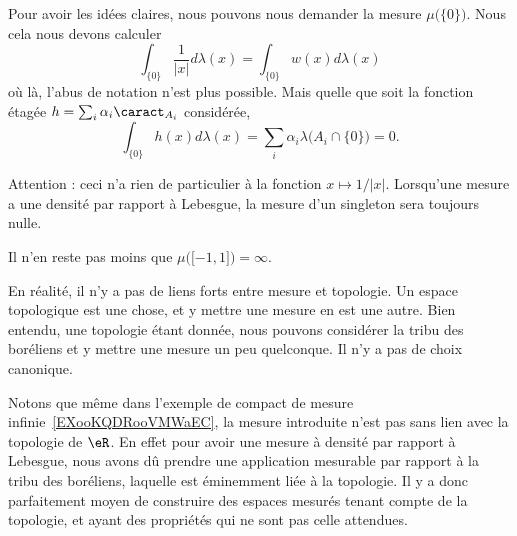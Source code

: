 \begin{example}
\begin{subproof}

		Pour avoir les idées claires, nous pouvons nous demander la mesure \( \mu\big( \{ 0 \} \big)\). Nous cela nous devons calculer
		\begin{equation}
			\int_{\{ 0 \}}\frac{1}{ | x | }d\lambda(x)=\int_{\{ 0 \}}w(x)d\lambda(x)
		\end{equation}
		où là, l'abus de notation n'est plus possible. Mais quelle que soit la fonction étagée \( h=\sum_i\alpha_i\caract_{A_i}\) considérée,
		\begin{equation}
			\int_{\{ 0 \}}h(x)d\lambda(x)=\sum_i\alpha_i\lambda\big( A_i\cap\{ 0 \} \big)=0.
		\end{equation}

		Attention : ceci n'a rien de particulier à la fonction \( x\mapsto 1/| x |\). Lorsqu'une mesure a une densité par rapport à Lebesgue, la mesure d'un singleton sera toujours nulle.


		Il n'en reste pas moins que \( \mu\big( \mathopen[ -1 , 1 \mathclose] \big)=\infty\).

	\end{subproof}
\end{example}

\begin{normaltext}
	En réalité, il n'y a pas de liens forts entre mesure et topologie. Un espace topologique est une chose, et y mettre une mesure en est une autre. Bien entendu, une topologie étant donnée, nous pouvons considérer la tribu des boréliens et y mettre une mesure un peu quelconque. Il n'y a pas de choix canonique.

	Notons que même dans l'exemple de compact de mesure infinie~\ref{EXooKQDRooVMWaEC}, la mesure introduite n'est pas sans lien avec la topologie de \( \eR\). En effet pour avoir une mesure à densité par rapport à Lebesgue, nous avons dû prendre une application mesurable par rapport à la tribu des boréliens, laquelle est éminemment liée à la topologie. Il y a donc parfaitement moyen de construire des espaces mesurés tenant compte de la topologie, et ayant des propriétés qui ne sont pas celle attendues.
\end{normaltext}

